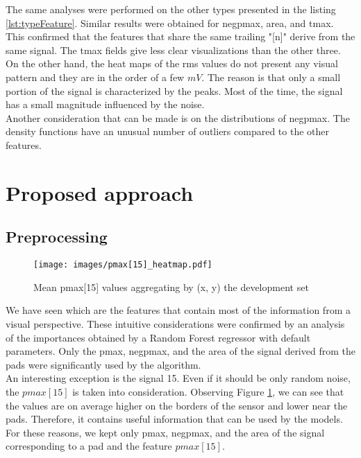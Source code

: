 \documentclass[conference]{IEEEtran}
\begin{document}
The same analyses were performed on the other types presented in the listing \ref{lst:typeFeature}. Similar results were obtained for negpmax, area, and tmax. This confirmed that the features that share the same trailing "[n]" derive from the same signal. The tmax fields give less clear visualizations than the other three. On the other hand, the heat maps of the rms values do not present any visual pattern and they are in the order of a few $mV$. The reason is that only a small portion of the signal is characterized by the peaks. Most of the time, the signal has a small magnitude influenced by the noise.\\

Another consideration that can be made is on the distributions of negpmax. The density functions have an unusual number of outliers compared to the other features. 

\section{Proposed approach}
\subsection{Preprocessing}

\begin{figure}[htbp]
\centerline{\texttt{[image: images/pmax[15]\_heatmap.pdf]}}
\caption{Mean pmax[15] values aggregating by (x, y) the development set}
\label{fig:pmax[15]_heatmap}
\end{figure}
We have seen which are the features that contain most of the information from a visual perspective. These intuitive considerations were confirmed by an analysis of the importances obtained by a Random Forest regressor with default parameters. Only the pmax, negpmax, and the area of the signal derived from the pads were significantly used by the algorithm.\\ 
An interesting exception is the signal 15. Even if it should be only random noise, the $pmax[15]$ is taken into consideration. Observing Figure \ref{fig:pmax[15]_heatmap}, we can see that the values are on average higher on the borders of the sensor and lower near the pads. Therefore, it contains useful information that can be used by the models. \\
For these reasons, we kept only pmax, negpmax, and the area of the signal corresponding to a pad and the feature $pmax[15]$.\\
\end{document}
